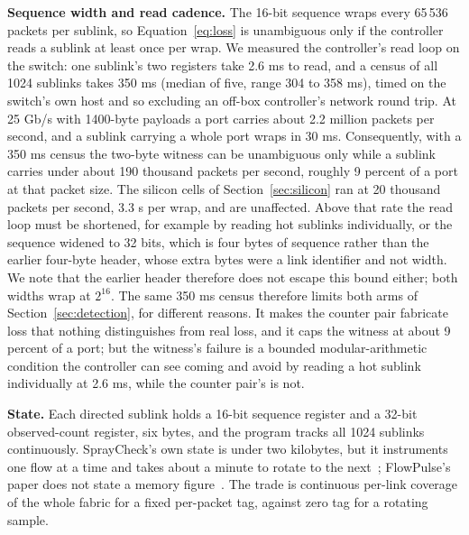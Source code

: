 \textbf{Sequence width and read cadence.} The 16-bit sequence wraps every 65\,536 packets per sublink, so Equation~\eqref{eq:loss} is unambiguous only if the controller reads a sublink at least once per wrap. We measured the controller's read loop on the switch: one sublink's two registers take 2.6 ms to read, and a census of all 1024 sublinks takes 350 ms (median of five, range 304 to 358 ms), timed on the switch's own host and so excluding an off-box controller's network round trip. At 25 Gb/s with 1400-byte payloads a port carries about 2.2 million packets per second, and a sublink carrying a whole port wraps in 30 ms. Consequently, with a 350 ms census the two-byte witness can be unambiguous only while a sublink carries under about 190 thousand packets per second, roughly 9 percent of a port at that packet size. The silicon cells of Section~\ref{sec:silicon} ran at 20 thousand packets per second, 3.3 s per wrap, and are unaffected. Above that rate the read loop must be shortened, for example by reading hot sublinks individually, or the sequence widened to 32 bits, which is four bytes of sequence rather than the earlier four-byte header, whose extra bytes were a link identifier and not width. We note that the earlier header therefore does not escape this bound either; both widths wrap at $2^{16}$. The same 350 ms census therefore limits both arms of Section~\ref{sec:detection}, for different reasons. It makes the counter pair fabricate loss that nothing distinguishes from real loss, and it caps the witness at about 9 percent of a port; but the witness's failure is a bounded modular-arithmetic condition the controller can see coming and avoid by reading a hot sublink individually at 2.6 ms, while the counter pair's is not.

\textbf{State.} Each directed sublink holds a 16-bit sequence register and a 32-bit observed-count register, six bytes, and the program tracks all 1024 sublinks continuously. SprayCheck's own state is under two kilobytes, but it instruments one flow at a time and takes about a minute to rotate to the next~\cite{spraycheck}; FlowPulse's paper does not state a memory figure~\cite{flowpulse}. The trade is continuous per-link coverage of the whole fabric for a fixed per-packet tag, against zero tag for a rotating sample.

